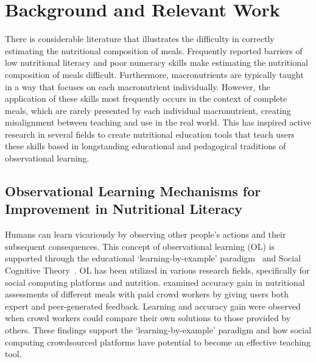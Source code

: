 \vspace{-5pt}
\section{Background and Relevant Work}
There is considerable literature that illustrates the difficulty in correctly estimating the nutritional composition of meals\cite{berkman2011low,chandon2007obesity,chaudhry2016evaluation,chaudry2013formative,stanton2006nutrition,kim2014energy,lansky1982estimates,schwartz2006ability}. Frequently reported barriers of low nutritional literacy and poor numeracy skills make estimating the nutritional composition of meals difficult. Furthermore, macronutrients are typically taught in a way that focuses on each macronutrient individually. However, the application of these skills most frequently occurs in the context of complete meals, which are rarely presented by each individual macronutrient, creating misalignment between teaching and use in the real world. This has inspired active research in several fields to create nutritional education tools that teach users these skills based in longstanding educational and pedagogical traditions of observational learning.

\vspace{-5pt}
\subsection{Observational Learning Mechanisms for Improvement in Nutritional Literacy}
Humans can learn vicariously by observing other people's actions and their subsequent consequences. This concept of observational learning (OL) is supported through the educational
`learning-by-example’ paradigm~\cite{anderson1997role,atkinson2000learning,brown1988preschool} and Social Cognitive Theory~\cite{bandura1989human,bandura1998health}. OL has been utilized in various research fields, specifically for social computing platforms and nutrition. \cite{mamykina2016learning} examined accuracy gain in nutritional assessments of different meals with paid crowd workers by giving users both expert and peer-generated feedback. 
Learning and accuracy gain were %
observed when crowd workers could compare their own solutions to those provided by others. These findings support the `learning-by-example’ paradigm and how social computing crowdsourced platforms have potential to become an effective teaching tool. 


